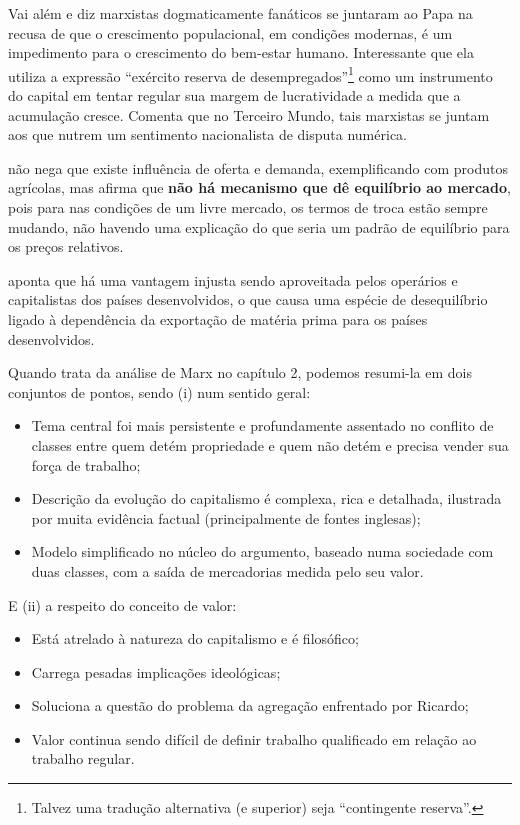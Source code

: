 	Vai além e diz marxistas dogmaticamente fanáticos se juntaram ao Papa na recusa de que o crescimento populacional, em condições modernas, é um impedimento para o crescimento do bem-estar humano. Interessante que ela utiliza a expressão ``exército reserva de desempregados''\footnote{Talvez uma tradução alternativa (e superior) seja ``contingente reserva''.} como um instrumento do capital em tentar regular sua margem de lucratividade a medida que a acumulação cresce. Comenta que no Terceiro Mundo, tais marxistas se juntam aos que nutrem um sentimento nacionalista de disputa numérica.
	
	 não nega que existe influência de oferta e demanda, exemplificando com produtos agrícolas, mas afirma que \textbf{não há mecanismo que dê equilíbrio ao mercado}, pois para  nas condições de um livre mercado, os termos de troca estão sempre mudando, não havendo uma explicação do que seria um padrão de equilíbrio para os preços relativos.
	
	 aponta que há uma vantagem injusta sendo aproveitada pelos operários e capitalistas dos países desenvolvidos, o que causa uma espécie de desequilíbrio ligado à dependência da exportação de matéria prima para os países desenvolvidos.
	
	Quando  trata da análise de Marx no capítulo 2, podemos resumi-la em dois conjuntos de pontos, sendo (i) num sentido geral:
	
	\begin{itemize}
		\item Tema central foi mais persistente e profundamente assentado no conflito de classes entre quem detém propriedade e quem não detém e precisa vender sua força de trabalho;
		\item Descrição da evolução do capitalismo é complexa, rica e detalhada, ilustrada por muita evidência factual (principalmente de fontes inglesas);
		\item Modelo simplificado no núcleo do argumento, baseado numa sociedade com duas classes, com a saída de mercadorias medida pelo seu valor.
	\end{itemize}
	
	E (ii) a respeito do conceito de valor:
	\begin{itemize}
		\item Está atrelado à natureza do capitalismo e é filosófico;
		\item Carrega pesadas implicações ideológicas;
		\item Soluciona a questão do problema da agregação enfrentado por Ricardo;
		\item Valor continua sendo difícil de definir trabalho qualificado em relação ao trabalho regular.
	\end{itemize}
	
